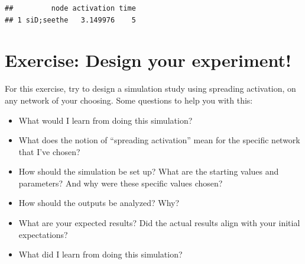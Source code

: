 \documentclass[
]{book}
\newenvironment{Shaded}{\begin{snugshade}}{\end{snugshade}}
\newcommand{\AttributeTok}[1]{\textcolor[rgb]{0.13,0.29,0.53}{#1}}
\newcommand{\CommentTok}[1]{\textcolor[rgb]{0.56,0.35,0.01}{\textit{#1}}}
\newcommand{\ConstantTok}[1]{\textcolor[rgb]{0.56,0.35,0.01}{#1}}
\newcommand{\DecValTok}[1]{\textcolor[rgb]{0.00,0.00,0.81}{#1}}
\newcommand{\FloatTok}[1]{\textcolor[rgb]{0.00,0.00,0.81}{#1}}
\newcommand{\FunctionTok}[1]{\textcolor[rgb]{0.13,0.29,0.53}{\textbf{#1}}}
\newcommand{\NormalTok}[1]{#1}
\newcommand{\OtherTok}[1]{\textcolor[rgb]{0.56,0.35,0.01}{#1}}
\newcommand{\SpecialCharTok}[1]{\textcolor[rgb]{0.81,0.36,0.00}{\textbf{#1}}}
\newcommand{\StringTok}[1]{\textcolor[rgb]{0.31,0.60,0.02}{#1}}
\providecommand{\tightlist}{%
  \setlength{\itemsep}{0pt}\setlength{\parskip}{0pt}}
\begin{document}
\begin{Shaded}
\end{Shaded}

\begin{verbatim}
##         node activation time
## 1 siD;seethe   3.149976    5
\end{verbatim}

\section{Exercise: Design your experiment!}\label{exercise-design-your-experiment}

For this exercise, try to design a simulation study using spreading activation, on any network of your choosing. Some questions to help you with this:

\begin{itemize}
\tightlist
\item
  What would I learn from doing this simulation?
\item
  What does the notion of ``spreading activation'' mean for the specific network that I've chosen?
\item
  How should the simulation be set up? What are the starting values and parameters? And why were these specific values chosen?
\item
  How should the outputs be analyzed? Why?
\item
  What are your expected results? Did the actual results align with your initial expectations?
\item
  What did I learn from doing this simulation?
\end{itemize}
\end{document}
